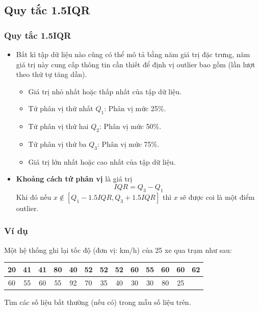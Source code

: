 \subsection{Quy tắc 1.5IQR}
\begin{frame}
\frametitle{Quy tắc 1.5IQR}
\begin{itemize}
    \item Bất kì tập dữ liệu nào cũng có thể mô tả bằng năm giá trị đặc trưng, năm giá trị này cung cấp thông tin cần thiết để định vị outlier bao gồm (lần lượt theo thứ tự tăng dần).
    \begin{itemize}
        \item Giá trị nhỏ nhất hoặc thấp nhất của tập dữ liệu.
        \item Tứ phân vị thứ nhất $Q_1$: Phân vị mức 25\%.
        \item Tứ phân vị thứ hai $Q_2$: Phân vị mức 50\%.
        \item Tứ phân vị thứ ba $Q_3$: Phân vị mức 75\%.
        \item Giá trị lớn nhất hoặc cao nhất của tập dữ liệu.
    \end{itemize}
    \item \textbf{Khoảng cách tứ phân vị} là giá trị
    \[
    IQR = Q_3 - Q_1
    \]
    Khi đó nếu $x \notin \left[Q_1 - 1.5IQR, Q_3 + 1.5IQR\right]$ thì $x$ sẽ được coi là một điểm outlier.
\end{itemize}
\end{frame}
\begin{frame}
\frametitle{Ví dụ}
	    Một hệ thống ghi lại tốc độ (đơn vị: km/h) của 25 xe qua trạm như sau: 
        \begin{center}
            \begin{tabular}{|c|c|c|c|c|c|c|c|c|c|c|c|c|}
	\hline 
	20 & 41 & 41 & 80 & 40 & 52 & 52 & 52 & 60 & 55 & 60 & 60 & 62 \\ \hline
60 & 55 & 60 & 55 & 92 & 70 & 35 & 40 & 30 & 30 & 80 & 25 &  \\ \hline
\end{tabular}
        \end{center}
        Tìm các số liệu bất thường (nếu có) trong mẫu số liệu trên.
\end{frame}

